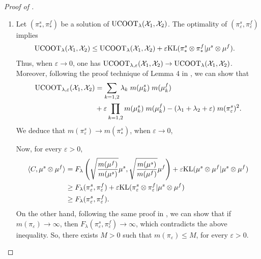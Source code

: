\begin{proof}[Proof of ]
\begin{enumerate}
    \item Let $(\pi_*^s, \pi_*^f)$ be a solution of $\text{UCOOT}_{\lambda}(\mathcal X_1, \mathcal X_2)$.
    The optimality of $(\pi_{\varepsilon}^s, \pi_{\varepsilon}^f)$ implies
    \begin{equation}
      \begin{split}
        \text{UCOOT}_{\lambda}(\mathcal X_1, \mathcal X_2)
      &\leq \text{UCOOT}_{\lambda}(\mathcal X_1, \mathcal X_2) +
      \varepsilon \text{KL}(\pi_*^s \otimes \pi_*^f \vert \mu^s \otimes \mu^f).
      \end{split}
    \end{equation}
    Thus, when $\varepsilon \to 0$, one has
    $\text{UCOOT}_{\lambda, \varepsilon}(\mathcal X_1, \mathcal X_2) \to \text{UCOOT}_{\lambda}(\mathcal X_1, \mathcal X_2)$. Moreover,
    following the proof technique of Lemma 4 in \citep{Khiem20}, we can show that
    \begin{align}
      \text{UCOOT}_{\lambda, \varepsilon}(\mathcal X_1, \mathcal X_2) &=
      \sum_{k=1, 2} \lambda_k \; m(\mu_k^s) \; m(\mu_k^f) \\
      &+ \varepsilon \prod_{k=1, 2} m(\mu_k^s) \; m(\mu_k^f)
      - (\lambda_1  + \lambda_2 + \varepsilon) \; m(\pi^s_{\varepsilon})^2.
    \end{align}
    We deduce that $m(\pi^s_{\varepsilon}) \to m(\pi^s_*)$, when $\varepsilon \to 0$,

    Now, for every $\varepsilon > 0$,
    \begin{equation}
      \begin{split}
        \langle C, \mu^s \otimes \mu^f \rangle &=
        F_{\lambda} \left( \sqrt{\frac{m(\mu^f)}{m(\mu^s)}} \mu^s, \sqrt{\frac{m(\mu^s)}{m(\mu^f)}} \mu^f \right) +
        \varepsilon \text{KL}( \mu^s \otimes \mu^f \vert \mu^s \otimes \mu^f ) \\
        &\geq F_{\lambda}(\pi_{\varepsilon}^s, \pi_{\varepsilon}^f) +
        \varepsilon \text{KL}(\pi_{\varepsilon}^s \otimes \pi_{\varepsilon}^f \vert \mu^s \otimes \mu^f) \\
        &\geq F_{\lambda}(\pi_{\varepsilon}^s, \pi_{\varepsilon}^f).
      \end{split}
    \end{equation}
    On the other hand, following the same proof in ,
    we can show that if
    $m(\pi_{\varepsilon}) \to \infty$, then
    $F_{\lambda}(\pi_{\varepsilon}^s, \pi_{\varepsilon}^f) \to \infty$, which
    contradicts the above inequality. So, there exists $M > 0$ such that
    $m(\pi_{\varepsilon}) \leq M$, for every $\varepsilon > 0$.


\end{enumerate}
\end{proof}
